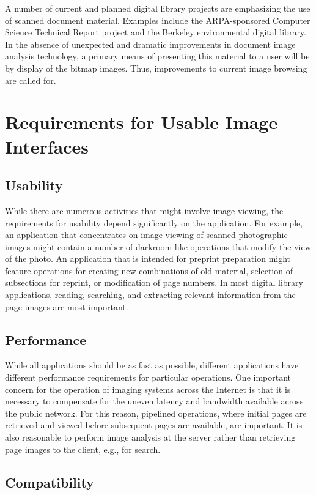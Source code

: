 A number of current and planned digital library projects are
emphasizing the use of scanned document material.  Examples include
the ARPA-sponsored Computer Science Technical Report project\cite{cstr} and
the Berkeley environmental digital library\cite{berk}. In the absence of
unexpected and dramatic improvements in document image analysis
technology, a primary means of presenting this material to a user will
be by display of the bitmap images. Thus, improvements to current
image browsing are called for.

\section{Requirements for Usable Image Interfaces}

\subsection{Usability}

While there are numerous activities that might involve image viewing,
the requirements for usability depend significantly on the
application. For example, an application that concentrates on image
viewing of scanned photographic images might contain a number of darkroom-like operations
that modify the view of the photo.  An application that is intended
for preprint preparation might feature operations for creating new combinations
of old material, selection of subsections for reprint, or modification of page numbers.  In 
most digital library applications, reading, searching, and extracting
relevant information from the page images are most important.

\subsection{Performance}

While all applications should be as fast as possible, different
applications have different performance requirements for particular operations. One
important concern for the operation of imaging systems across the
Internet is that it is necessary to compensate for the uneven latency and bandwidth
available across the public network. For this reason, pipelined
operations, where initial pages are retrieved and viewed before
subsequent pages are available, are important. It is also reasonable to
perform image analysis at the server rather than retrieving page
images to the client, e.g., for search.

\subsection{Compatibility}

